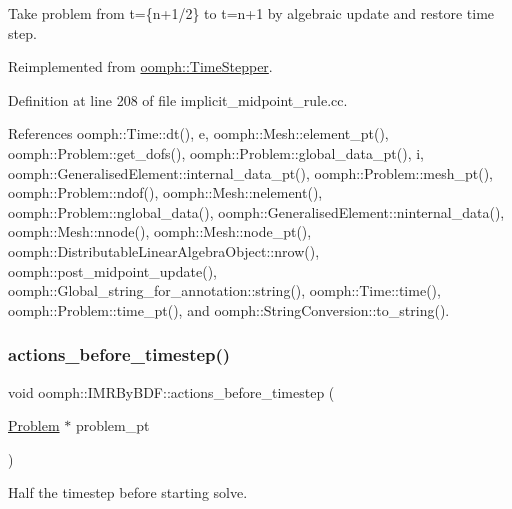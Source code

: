 Take problem from t=\{n+1/2\} to t=n+1 by algebraic update and restore time step. 

Reimplemented from \hyperlink{classoomph_1_1TimeStepper_a3a0fabf83f9bdc89800cd3501df2c586}{oomph\+::\+Time\+Stepper}.



Definition at line 208 of file implicit\+\_\+midpoint\+\_\+rule.\+cc.



References oomph\+::\+Time\+::dt(), e, oomph\+::\+Mesh\+::element\+\_\+pt(), oomph\+::\+Problem\+::get\+\_\+dofs(), oomph\+::\+Problem\+::global\+\_\+data\+\_\+pt(), i, oomph\+::\+Generalised\+Element\+::internal\+\_\+data\+\_\+pt(), oomph\+::\+Problem\+::mesh\+\_\+pt(), oomph\+::\+Problem\+::ndof(), oomph\+::\+Mesh\+::nelement(), oomph\+::\+Problem\+::nglobal\+\_\+data(), oomph\+::\+Generalised\+Element\+::ninternal\+\_\+data(), oomph\+::\+Mesh\+::nnode(), oomph\+::\+Mesh\+::node\+\_\+pt(), oomph\+::\+Distributable\+Linear\+Algebra\+Object\+::nrow(), oomph\+::post\+\_\+midpoint\+\_\+update(), oomph\+::\+Global\+\_\+string\+\_\+for\+\_\+annotation\+::string(), oomph\+::\+Time\+::time(), oomph\+::\+Problem\+::time\+\_\+pt(), and oomph\+::\+String\+Conversion\+::to\+\_\+string().

\mbox{\label{classoomph_1_1IMRByBDF_abc155a68889d297f732a083d911b4627}} 
\subsubsection{\texorpdfstring{actions\+\_\+before\+\_\+timestep()}{actions\_before\_timestep()}}
{\footnotesize\ttfamily void oomph\+::\+I\+M\+R\+By\+B\+D\+F\+::actions\+\_\+before\+\_\+timestep (\begin{DoxyParamCaption}\item[{\hyperlink{classoomph_1_1Problem}{Problem} $\ast$}]{problem\+\_\+pt }\end{DoxyParamCaption})\hspace{0.3cm}{\ttfamily [virtual]}}



Half the timestep before starting solve. 



